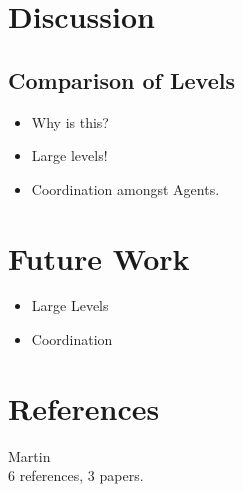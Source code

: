\documentclass[letterpaper]{article}
\begin{document}
\section{Discussion}
	\subsection{Comparison of Levels}
	\begin{itemize}
		\item{Why is this?}
		\item{Large levels!}
		\item{Coordination amongst Agents.}
	\end{itemize}


\section{Future Work}
	\begin{itemize}
		\item{Large Levels}
		\item{Coordination}
	\end{itemize}

\section{References}
	Martin\\
	6 references, 3 papers.
		
		


\end{document}
